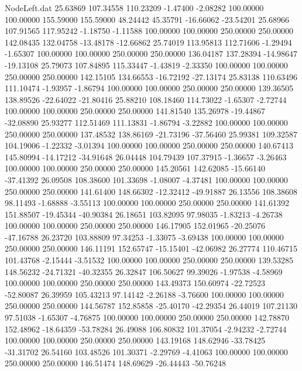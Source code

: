 \begin{filecontents}{NodeLeft.dat}
  25.63869  107.34558  110.23209    -1.47400   -2.08282  100.00000  100.00000  155.59000  155.59000   48.24442   45.35791  -16.66062  -23.54201
  25.68966  107.91565  117.95242    -1.18750   -1.11588  100.00000  100.00000  250.00000  250.00000  142.08435  132.04758  -13.48178  -12.66862
  25.74019  113.95813  112.71606    -1.29494   -1.65307  100.00000  100.00000  250.00000  250.00000  136.04187  137.28394  -14.98647  -19.13108
  25.79073  107.84895  115.33447    -1.43819   -2.33350  100.00000  100.00000  250.00000  250.00000  142.15105  134.66553  -16.72192  -27.13174
  25.83138  110.63496  111.10474    -1.93957   -1.86794  100.00000  100.00000  250.00000  250.00000  139.36505  138.89526  -22.64022  -21.80416
  25.88210  108.18460  114.73022    -1.65307   -2.72744  100.00000  100.00000  250.00000  250.00000  141.81540  135.26978  -19.44867  -32.08890
  25.93277  112.51469  111.13831    -1.86794   -3.22882  100.00000  100.00000  250.00000  250.00000  137.48532  138.86169  -21.73196  -37.56460
  25.99381  109.32587  104.19006    -1.22332   -3.01394  100.00000  100.00000  250.00000  250.00000  140.67413  145.80994  -14.17212  -34.91648
  26.04448  104.79439  107.37915    -1.36657   -3.26463  100.00000  100.00000  250.00000  250.00000  145.20561  142.62085  -15.66140  -37.41392
  26.09508  108.38600  101.33698    -1.08007   -4.37481  100.00000  100.00000  250.00000  250.00000  141.61400  148.66302  -12.32412  -49.91887
  26.13556  108.38608   98.11493    -1.68888   -3.55113  100.00000  100.00000  250.00000  250.00000  141.61392  151.88507  -19.45344  -40.90384
  26.18651  103.82095   97.98035    -1.83213   -4.26738  100.00000  100.00000  250.00000  250.00000  146.17905  152.01965  -20.25076  -47.16788
  26.23720  103.88809   97.34253    -1.33075   -3.69438  100.00000  100.00000  250.00000  250.00000  146.11191  152.65747  -15.15401  -42.06982
  26.27774  110.46715  101.43768    -2.15444   -3.51532  100.00000  100.00000  250.00000  250.00000  139.53285  148.56232  -24.71321  -40.32355
  26.32847  106.50627   99.39026    -1.97538   -4.58969  100.00000  100.00000  250.00000  250.00000  143.49373  150.60974  -22.72523  -52.80087
  26.39959  105.43213   97.14142    -2.26188   -3.76600  100.00000  100.00000  250.00000  250.00000  144.56787  152.85858  -25.40170  -42.29354
  26.44019  107.21130   97.51038    -1.65307   -4.76875  100.00000  100.00000  250.00000  250.00000  142.78870  152.48962  -18.64359  -53.78284
  26.49088  106.80832  101.37054    -2.94232   -2.72744  100.00000  100.00000  250.00000  250.00000  143.19168  148.62946  -33.78425  -31.31702
  26.54160  103.48526  101.30371    -2.29769   -4.41063  100.00000  100.00000  250.00000  250.00000  146.51474  148.69629  -26.44443  -50.76248

\end{filecontents}
